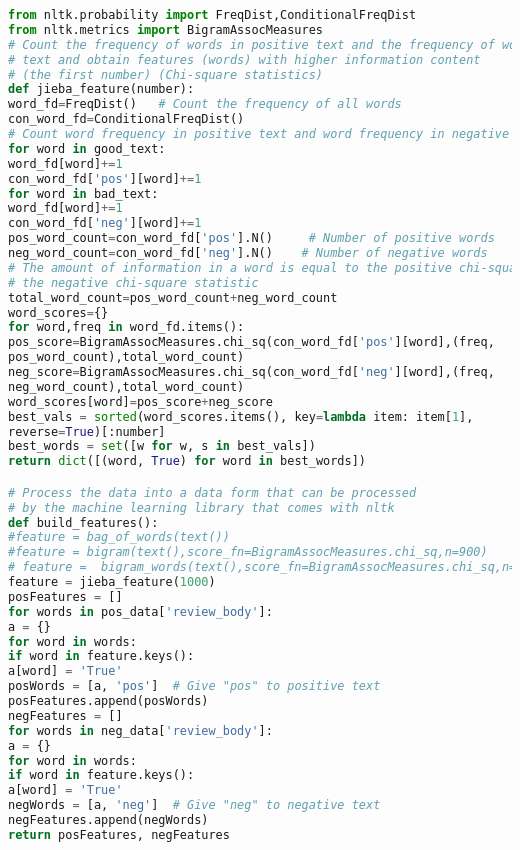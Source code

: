 \documentclass{mcmthesis}
\begin{document}
\begin{appendices}
\begin{lstlisting}[language=python]
from nltk.probability import FreqDist,ConditionalFreqDist
from nltk.metrics import BigramAssocMeasures
# Count the frequency of words in positive text and the frequency of words in negative 
# text and obtain features (words) with higher information content 
# (the first number) (Chi-square statistics)
def jieba_feature(number):
word_fd=FreqDist()   # Count the frequency of all words
con_word_fd=ConditionalFreqDist()
# Count word frequency in positive text and word frequency in negative text
for word in good_text:
word_fd[word]+=1
con_word_fd['pos'][word]+=1
for word in bad_text:
word_fd[word]+=1
con_word_fd['neg'][word]+=1
pos_word_count=con_word_fd['pos'].N()     # Number of positive words
neg_word_count=con_word_fd['neg'].N()    # Number of negative words
# The amount of information in a word is equal to the positive chi-square statistic plus
# the negative chi-square statistic
total_word_count=pos_word_count+neg_word_count
word_scores={}
for word,freq in word_fd.items():
pos_score=BigramAssocMeasures.chi_sq(con_word_fd['pos'][word],(freq,
pos_word_count),total_word_count)
neg_score=BigramAssocMeasures.chi_sq(con_word_fd['neg'][word],(freq,
neg_word_count),total_word_count)
word_scores[word]=pos_score+neg_score
best_vals = sorted(word_scores.items(), key=lambda item: item[1],
reverse=True)[:number]
best_words = set([w for w, s in best_vals])
return dict([(word, True) for word in best_words])

# Process the data into a data form that can be processed
# by the machine learning library that comes with nltk
def build_features():
#feature = bag_of_words(text())
#feature = bigram(text(),score_fn=BigramAssocMeasures.chi_sq,n=900)
# feature =  bigram_words(text(),score_fn=BigramAssocMeasures.chi_sq,n=900)
feature = jieba_feature(1000)
posFeatures = []
for words in pos_data['review_body']:
a = {}
for word in words:
if word in feature.keys():
a[word] = 'True'
posWords = [a, 'pos']  # Give "pos" to positive text
posFeatures.append(posWords)
negFeatures = []
for words in neg_data['review_body']:
a = {}
for word in words:
if word in feature.keys():
a[word] = 'True'
negWords = [a, 'neg']  # Give "neg" to negative text
negFeatures.append(negWords)
return posFeatures, negFeatures


\end{lstlisting}
\end{appendices}
\end{document}

